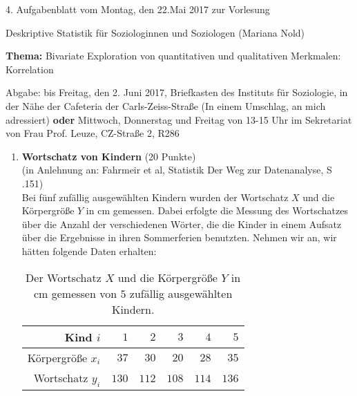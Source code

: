 \documentclass[11pt]{article}
\newcommand{\VORLESUNG}{Deskriptive Statistik für Soziologinnen und Soziologen}
\newcommand{\STAFF}{Mariana Nold}
\newcommand{\ASSIGNMENT}{4}
\newcommand{\HANDOUT}{Montag, den 22.Mai   2017}
\newcommand{\DELIVER}{bis Freitag, den 2. Juni 2017, Briefkasten des Instituts für Soziologie, in der Nähe der Cafeteria der Carls-Zeiss-Straße (In einem Umschlag, an mich adressiert) \textbf{oder} Mittwoch, Donnerstag und Freitag von 13-15 Uhr im Sekretariat von Frau Prof. Leuze, CZ-Straße 2, R286}
\newcommand{\PRACTICAL}[1]{\marginpar{\tiny {\bf Aufgabe \\ abgeben!} #1}}
\newcommand{\titel}{Bivariate Exploration von  quantitativen und qualitativen 
Merkmalen: Korrelation}
\newcommand{\startwert}{14}
\newcommand{\punkte}[1]{{\small{ }(#1 Punkte)}}
\newcommand{\aufgabe}[1]{\item{\bf #1}}
\begin{document}

\begin{center}
\ASSIGNMENT{}. Aufgabenblatt vom \HANDOUT{} zur Vorlesung 
\vspace*{0.5cm}

{\Large \VORLESUNG{}}
(\STAFF{}) 


\vspace*{0.5cm}
{\textbf{Thema:} \titel{}\\}
\vspace*{0.2cm}

{\small Abgabe: \DELIVER{}}
\vspace*{1cm}
\end{center}

\begin{enumerate}\addtocounter{enumi}{\startwert}




\aufgabe{Wortschatz von Kindern} \punkte{20} \PRACTICAL{}\\
(in Anlehnung an: Fahrmeir et al, Statistik Der Weg zur Datenanalyse, S .151)\\
Bei fünf zufällig ausgewählten Kindern wurden der Wortschatz $X$ und die 
Körpergröße $Y$ in cm gemessen. Dabei erfolgte die Messung des Wortschatzes
über die Anzahl der verschiedenen Wörter, die die Kinder in einem Aufsatz über die 
Ergebnisse in ihren Sommerferien benutzten. Nehmen wir an,
wir hätten folgende Daten erhalten:

 \begin{table}[h]
 \centering 
\begin{tabular}{|r|r|r|r|r|r|}
  \hline
   Kind  $i$     &   $1$    & $2$   & $3$   & $4$   & $5$ \\ \hline
   Körpergröße $x_{i}$ & $37$ & $30$ & $20$ & $28$ & $35$  \\ \hline
   Wortschatz  $y_{i}$ & $130$& $112$ & $108$&  $114$ & $136$ \\ \hline
  \end{tabular}
 \caption{Der Wortschatz $X$ und die Körpergröße $Y$ in cm gemessen von $5$
 zufällig ausgewählten Kindern. \label{tab1}}
 \end{table}  
 

\end{enumerate}
\end{document}
